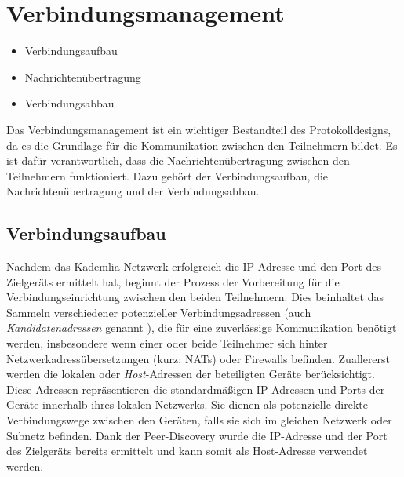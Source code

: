 \section{Verbindungsmanagement}
\label{subsec:routing}

\begin{itemize}
    \item Verbindungsaufbau
    \item Nachrichtenübertragung
    \item Verbindungsabbau
\end{itemize}


\noindent Das Verbindungsmanagement ist ein wichtiger Bestandteil des Protokolldesigns, da es die Grundlage für die Kommunikation zwischen den Teilnehmern bildet. Es ist dafür verantwortlich, dass die Nachrichtenübertragung zwischen den Teilnehmern funktioniert. Dazu gehört der Verbindungsaufbau, die Nachrichtenübertragung und der Verbindungsabbau.

\subsection{Verbindungsaufbau}

Nachdem das Kademlia-Netzwerk erfolgreich die IP-Adresse und den Port des Zielgeräts ermittelt hat, beginnt der Prozess der Vorbereitung für die Verbindungseinrichtung zwischen den beiden Teilnehmern. Dies beinhaltet das Sammeln verschiedener potenzieller Verbindungsadressen (auch \textit{Kandidatenadressen} genannt \parencite[S. 8]{rfc8445_ICE}), die für eine zuverlässige Kommunikation benötigt werden, insbesondere wenn einer oder beide Teilnehmer sich hinter Netzwerkadressübersetzungen (kurz: NATs) oder Firewalls befinden. Zuallererst werden die lokalen oder \textit{Host}-Adressen der beteiligten Geräte berücksichtigt. Diese Adressen repräsentieren die standardmäßigen IP-Adressen und Ports der Geräte innerhalb ihres lokalen Netzwerks. Sie dienen als potenzielle direkte Verbindungswege zwischen den Geräten, falls sie sich im gleichen Netzwerk oder Subnetz befinden. Dank der Peer-Discovery wurde die IP-Adresse und der Port des Zielgeräts bereits ermittelt und kann somit 
als Host-Adresse verwendet werden.


